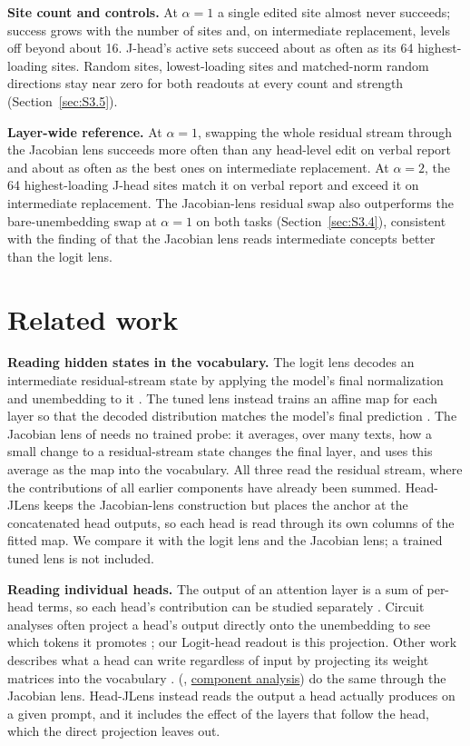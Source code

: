 \documentclass[11pt,a4paper]{article}
\begin{document}
\textbf{Site count and controls.} At $\alpha=1$ a single edited site almost never succeeds; success grows with the number of sites and, on intermediate replacement, levels off beyond about 16. J-head's active sets succeed about as often as its 64 highest-loading sites. Random sites, lowest-loading sites and matched-norm random directions stay near zero for both readouts at every count and strength (Section~\ref{sec:S3.5}).

\textbf{Layer-wide reference.} At $\alpha=1$, swapping the whole residual stream through the Jacobian lens succeeds more often than any head-level edit on verbal report and about as often as the best ones on intermediate replacement. At $\alpha=2$, the 64 highest-loading J-head sites match it on verbal report and exceed it on intermediate replacement. The Jacobian-lens residual swap also outperforms the bare-unembedding swap at $\alpha=1$ on both tasks (Section~\ref{sec:S3.4}), consistent with the finding of \citet{gurnee2026} that the Jacobian lens reads intermediate concepts better than the logit lens.

\section{Related work}\label{sec:5}

\textbf{Reading hidden states in the vocabulary.} The logit lens decodes an intermediate residual-stream state by applying the model's final normalization and unembedding to it \citep{nostalgebraist2020}. The tuned lens instead trains an affine map for each layer so that the decoded distribution matches the model's final prediction \citep{belrose2023}. The Jacobian lens of \citet{gurnee2026} needs no trained probe: it averages, over many texts, how a small change to a residual-stream state changes the final layer, and uses this average as the map into the vocabulary. All three read the residual stream, where the contributions of all earlier components have already been summed. Head-JLens keeps the Jacobian-lens construction but places the anchor at the concatenated head outputs, so each head is read through its own columns of the fitted map. We compare it with the logit lens and the Jacobian lens; a trained tuned lens is not included.

\textbf{Reading individual heads.} The output of an attention layer is a sum of per-head terms, so each head's contribution can be studied separately \citep{elhage2021}. Circuit analyses often project a head's output directly onto the unembedding to see which tokens it promotes \citep[e.g.,][]{wang2023}; our Logit-head readout is this projection. Other work describes what a head can write regardless of input by projecting its weight matrices into the vocabulary \citep{dar2023}. \citeauthor{gurnee2026} (\citeyear{gurnee2026}, \href{https://transformer-circuits.pub/2026/workspace/\#app-component-interp}{component analysis}) do the same through the Jacobian lens. Head-JLens instead reads the output a head actually produces on a given prompt, and it includes the effect of the layers that follow the head, which the direct projection leaves out.
\end{document}
